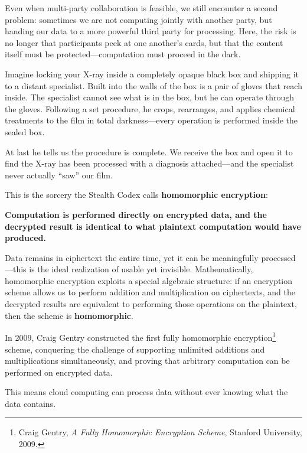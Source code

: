 Even when multi-party collaboration is feasible, we still encounter a second problem:
sometimes we are not computing jointly with another party, but handing our data to a more powerful third party for processing.
Here, the risk is no longer that participants peek at one another's cards, but that the content itself must be protected---computation must proceed in the dark.

\vspace{1em}

Imagine locking your X-ray inside a completely opaque black box and shipping it to a distant specialist.
Built into the walls of the box is a pair of gloves that reach inside.
The specialist cannot see what is in the box, but he can operate through the gloves.
Following a set procedure, he crops, rearranges, and applies chemical treatments to the film in total darkness---every operation is performed inside the sealed box.


At last he tells us the procedure is complete.
We receive the box and open it to find the X-ray has been processed with a diagnosis attached---and the specialist never actually ``saw'' our film.

\vspace{1em}

This is the sorcery the Stealth Codex calls \textbf{homomorphic encryption}:

\textbf{Computation is performed directly on encrypted data, and the decrypted result is identical to what plaintext computation would have produced.}

Data remains in ciphertext the entire time, yet it can be meaningfully processed---this is the ideal realization of usable yet invisible.
Mathematically, homomorphic encryption exploits a special algebraic structure: if an encryption scheme allows us to perform addition and multiplication on ciphertexts, and the decrypted results are equivalent to performing those operations on the plaintext, then the scheme is \textbf{homomorphic}.

\vspace{1em}

In 2009, Craig Gentry constructed the first fully homomorphic encryption\footnote{Craig Gentry, \textit{A Fully Homomorphic Encryption Scheme}, Stanford University, 2009.} scheme, conquering the challenge of supporting unlimited additions and multiplications simultaneously, and proving that arbitrary computation can be performed on encrypted data.

This means cloud computing can process data without ever knowing what the data contains.

